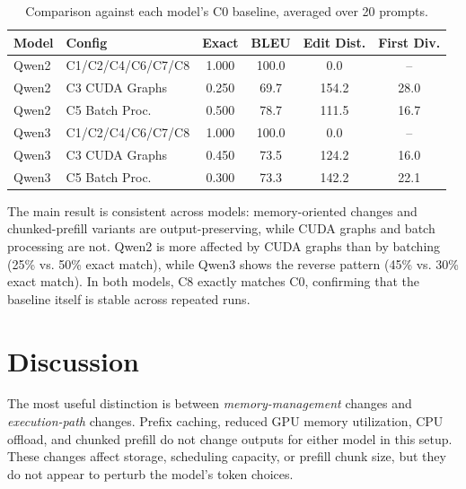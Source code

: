 \documentclass[11pt, letterpaper]{article}
\begin{document}
\begin{table}[h]
\centering
\caption{Comparison against each model's C0 baseline, averaged over 20 prompts.}
\label{tab:main-results}
\small
\begin{tabular}{@{} l l c c c c @{} }
\toprule
\textbf{Model} & \textbf{Config} & \textbf{Exact} & \textbf{BLEU} & \textbf{Edit Dist.} & \textbf{First Div.} \\
\midrule
Qwen2 & C1/C2/C4/C6/C7/C8 & \textcolor{identical}{1.000} & \textcolor{identical}{100.0} & \textcolor{identical}{0.0} & -- \\
Qwen2 & C3 CUDA Graphs & \textcolor{different}{0.250} & \textcolor{different}{69.7} & \textcolor{different}{154.2} & 28.0 \\
Qwen2 & C5 Batch Proc. & \textcolor{different}{0.500} & \textcolor{different}{78.7} & \textcolor{different}{111.5} & 16.7 \\
\midrule
Qwen3 & C1/C2/C4/C6/C7/C8 & \textcolor{identical}{1.000} & \textcolor{identical}{100.0} & \textcolor{identical}{0.0} & -- \\
Qwen3 & C3 CUDA Graphs & \textcolor{different}{0.450} & \textcolor{different}{73.5} & \textcolor{different}{124.2} & 16.0 \\
Qwen3 & C5 Batch Proc. & \textcolor{different}{0.300} & \textcolor{different}{73.3} & \textcolor{different}{142.2} & 22.1 \\
\bottomrule
\end{tabular}
\end{table}

The main result is consistent across models: memory-oriented changes and
chunked-prefill variants are output-preserving, while CUDA graphs and batch
processing are not.  Qwen2 is more affected by CUDA graphs than by batching
(25\% vs. 50\% exact match), while Qwen3 shows the reverse pattern (45\% vs.
30\% exact match).  In both models, C8 exactly matches C0, confirming that the
baseline itself is stable across repeated runs.

\section{Discussion}

The most useful distinction is between \emph{memory-management} changes and
\emph{execution-path} changes.  Prefix caching, reduced GPU memory utilization,
CPU offload, and chunked prefill do not change outputs for either model in this
setup.  These changes affect storage, scheduling capacity, or prefill chunk size,
but they do not appear to perturb the model's token choices.
\end{document}
